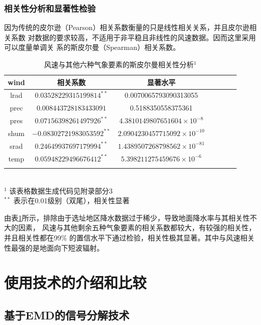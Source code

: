 \documentclass[AutoFakeBold]{LZUThesis}
\begin{document}
\subsection{相关性分析和显著性检验}
因为传统的皮尔逊（Pearson）相关系数衡量的只是线性相关关系，并且皮尔逊相关系数
对数据的要求较高，不适用于非平稳且非线性的风速数据。因而这里采用可以度量单调关
系的斯皮尔曼（Spearman）相关系数。

\begin{table}[H]
    \centering
    \caption{风速与其他六种气象要素的斯皮尔曼相关性分析$^1$}
    \begin{tabular}{ccccccc}
    \toprule
    wind & 相关系数 & 显著水平 \\
    \midrule
    lrad & $0.03528229315199814^{**}$ & 0.0070065793090313055 \\
    prec & $0.008443728183433091$ & 0.5188350558375361 \\
    pres & $0.07156398261497926^{**}$ & $4.3810149807651604\times10^{-8}$ \\
    shum & $-0.08302721983053592^{**}$ & $2.0904230457715092\times10^{-10}$ \\
    srad & $0.24649937697179994^{**}$ & $1.4389507268798562\times10^{-81}$ \\
    temp & $0.05948229496676412^{**}$ & $5.398211275459676\times10^{-6}$ \\
    \bottomrule \\
    \end{tabular} \\
    \footnotesize{$^1$ 该表格数据生成代码见附录部分3} \\
    \footnotesize{$^{**}$ 表示在0.01级别（双尾），相关性显著} \\
    \label{relativity-analysis}
\end{table}

由表\ref{relativity-analysis}所示，排除由于选址地区降水数据过于稀少，导致地面降水率与其相关性不大的因素，
风速与其他剩余五种气象要素的相关系数都较大，有较强的相关性，并且相关性都在99\%
的置信水平下通过检验，相关性极其显著。其中与风速相关性最强的是地面向下短波辐射。



\chapter{使用技术的介绍和比较}
\section{基于EMD的信号分解技术}
\end{document}
